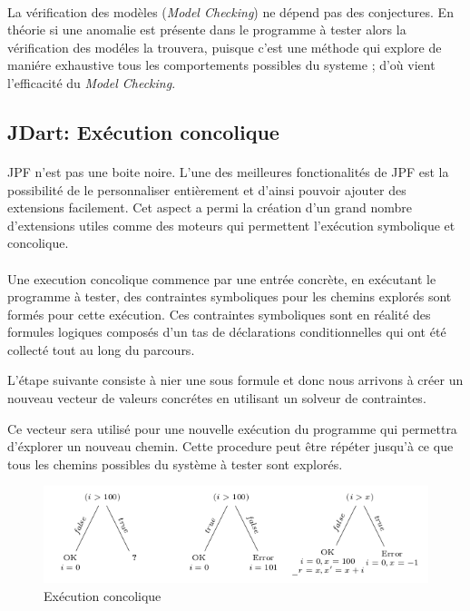 			\paragraph{}
				La vérification des modèles (\textit{Model Checking}) ne dépend pas des conjectures. En théorie si une anomalie est présente dans le programme à tester
				alors la vérification des modéles la trouvera, puisque c'est une méthode qui explore de maniére exhaustive tous les comportements possibles du systeme ;
				d'où vient l'efficacité du \textit{Model Checking}.
		\subsection{JDart: Exécution concolique}
			\nocite{JDart}
			\nocite{JDart2}

			\paragraph{}
				\gls{JPF} n'est pas une boite noire. L'une des meilleures fonctionalités de \gls{JPF} est la possibilité de le personnaliser entièrement et d'ainsi pouvoir ajouter des extensions facilement.
				Cet aspect a permi la création d'un grand nombre d'extensions utiles comme des moteurs
				qui permettent l'exécution symbolique et concolique.

			\paragraph{}
				Une execution concolique commence par une entrée concrète, en exécutant le programme à tester, des contraintes symboliques pour les chemins explorés
				sont formés pour cette exécution. Ces contraintes symboliques sont en réalité des formules logiques composés d'un tas de déclarations conditionnelles
				qui ont été collecté tout au long du parcours.

				L'étape suivante consiste à nier une sous formule et donc nous arrivons à créer un nouveau vecteur de valeurs concrétes en utilisant un
				solveur de contraintes.

				Ce vecteur sera utilisé pour une nouvelle exécution du programme qui permettra d'éxplorer un nouveau chemin.
				Cette procedure peut être répéter jusqu'à ce que tous les chemins possibles du système à tester sont explorés.
				
			\begin{figure}[H]
				\centering
					\includegraphics[scale=0.5]{images/concolic.png}
				\caption{Exécution concolique}
			\end{figure}
				
